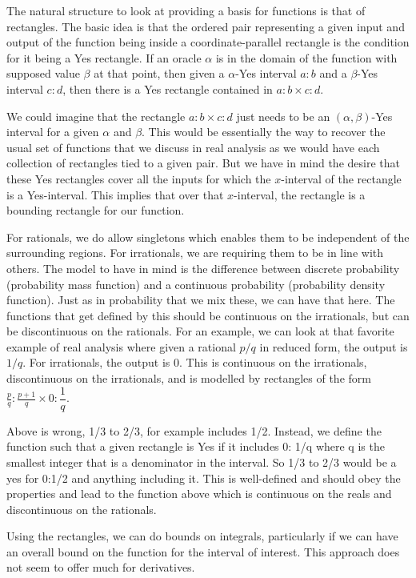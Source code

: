 \documentclass[12pt]{article}
\theoremstyle{remark}
\begin{document}
The natural structure to look at providing a basis for functions is that of rectangles. The basic idea is that the ordered pair representing a given input and output of the function being inside a coordinate-parallel rectangle is the condition for it being a Yes rectangle. If an oracle $\alpha$ is in the domain of the function with supposed value $\beta$ at that point, then given a $\alpha$-Yes interval $a:b$ and a $\beta$-Yes interval $c:d$, then there is a Yes rectangle contained in $a:b \times c:d$. 

We could imagine that the rectangle $a:b \times c:d$ just needs to be an $(\alpha, \beta)$-Yes interval for a given $\alpha$ and $\beta$. This would be essentially the way to recover the usual set of functions that we discuss in real analysis as we would have each collection of rectangles tied to a given pair. But we have in mind the desire that these Yes rectangles cover all the inputs for which the $x$-interval of the rectangle is a Yes-interval. This implies that over that $x$-interval, the rectangle is a bounding rectangle for our function. 

For rationals, we do allow singletons which enables them to be independent of the surrounding regions. For irrationals, we are requiring them to be in line with others. The model to have in mind is the difference between discrete probability (probability mass function) and a continuous probability (probability density function). Just as in probability that we mix these, we can have that here. The functions that get defined by this should be continuous on the irrationals, but can be discontinuous on the rationals. For an example, we can look at that favorite example of real analysis where given a rational $p/q$ in reduced form, the output is $1/q$. For irrationals, the output is 0. This is continuous on the irrationals, discontinuous on the irrationals, and is modelled by rectangles of the form $\frac{p}{q}:\frac{p+1}{q} \times 0:\dfrac{1}{q}$. 

Above is wrong, 1/3 to 2/3, for example includes 1/2.  Instead, we define the function such that a given rectangle is Yes if it includes 0: 1/q  where q is the smallest integer that is a denominator in the interval. So 1/3 to 2/3 would be a yes for 0:1/2 and anything including it. This is well-defined and should obey the properties and lead to the function above which is continuous on the reals and discontinuous on the rationals. 




Using the rectangles, we can do bounds on integrals, particularly if we can have an overall bound on the function for the interval of interest. This approach does not seem to offer much for derivatives. 
\end{document}
